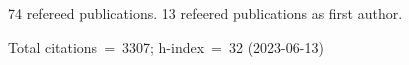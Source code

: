 74 refereed publications. 13 refeered publications as first author.

Total citations~=~3307; h-index~=~32 (2023-06-13)